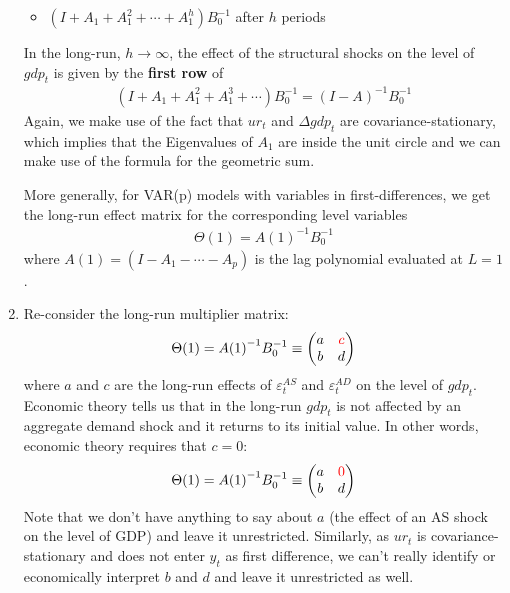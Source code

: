 \begin{enumerate}
\begin{itemize}
    \item \((I+A_1+A_1^2+\cdots +A_1^h) B_0^{-1}\) after $h$ periods
\end{itemize}
In the long-run, \(h\rightarrow\infty \), the effect of the structural shocks on the level of \(gdp_t\) is given by the \textbf{first row} of
\begin{align*}
    (I+A_1+A_1^2+A_1^3+\cdots ) B_0^{-1} = {(I-A)}^{-1} B_0^{-1}
\end{align*}
Again, we make use of the fact that \(ur_t\) and \(\Delta gdp_t\) are covariance-stationary,
  which implies that the Eigenvalues of \(A_1\) are inside the unit circle and we can make use of the formula for the geometric sum.

More generally, for VAR(p) models with variables in first-differences, we get the long-run effect matrix for the corresponding level variables
\begin{align*}
    \Theta(1) = {A(1)}^{-1} B_0^{-1}
\end{align*}
where \(A(1)= (I - A_1 - \cdots  - A_p)\) is the lag polynomial evaluated at \(L=1\).

\item Re-consider the long-run multiplier matrix:
\begin{align*}
\Theta(1) = {A(1)}^{-1} B_0^{-1} \equiv \begin{pmatrix} a & \textcolor{red}{c}\\ b & d \end{pmatrix}
\end{align*}
where \(a\) and \(c\) are the long-run effects of \(\varepsilon_t^{AS}\) and \(\varepsilon_t^{AD}\) on the level of \(gdp_t\).
Economic theory tells us that in the long-run \(gdp_t\) is not affected by an aggregate demand shock and it returns to its initial value.
In other words, economic theory requires that \(c=0\):
\begin{align*}
\Theta(1) = {A(1)}^{-1} B_0^{-1} \equiv \begin{pmatrix} a & \textcolor{red}{0}\\ b & d \end{pmatrix}
\end{align*}
Note that we don't have anything to say about $a$ (the effect of an AS shock on the level of GDP) and leave it unrestricted.
Similarly, as \(ur_t\) is covariance-stationary and does not enter \(y_t\) as first difference,
  we can't really identify or economically interpret \(b\) and \(d\) and leave it unrestricted as well.


\end{enumerate}
